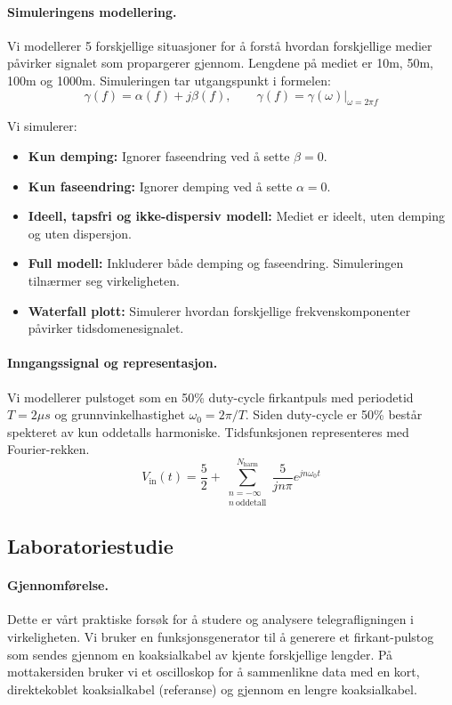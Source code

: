 \paragraph{Simuleringens modellering.}
Vi modellerer 5 forskjellige situasjoner for å forstå hvordan forskjellige medier påvirker signalet som propargerer gjennom. Lengdene på mediet er 10m, 50m, 100m og 1000m. Simuleringen tar utgangspunkt i formelen:
\[
\gamma (f) = \alpha(f) + j\beta(f), \qquad \gamma(f) = \gamma(\omega)|_{\omega = 2\pi f}
\]

Vi simulerer:
\begin{itemize}
    \item \textbf{Kun demping:} Ignorer faseendring ved å sette $\beta = 0$.
    \item \textbf{Kun faseendring:} Ignorer demping ved å sette $\alpha = 0$.
    \item \textbf{Ideell, tapsfri og ikke-dispersiv modell:} Mediet er ideelt, uten demping og uten dispersjon.
    \item \textbf{Full modell:} Inkluderer både demping og faseendring. Simuleringen tilnærmer seg virkeligheten.
    \item \textbf{Waterfall plott:} Simulerer hvordan forskjellige frekvenskomponenter påvirker tidsdomenesignalet.
\end{itemize}

\paragraph{Inngangssignal og representasjon.}
Vi modellerer pulstoget som en 50\% duty-cycle firkantpuls med periodetid $T = 2 \mu s$ og grunnvinkelhastighet $\omega_0 = 2\pi / T$. Siden duty-cycle er 50\% består spekteret av kun oddetalls harmoniske. Tidsfunksjonen representeres med Fourier-rekken.
\begin{equation}
    V_{\mathrm{in}}(t) = \frac{5}{2} + \sum_{\substack{n=-\infty\\ n\ \text{oddetall}}}^{N_{\mathrm{harm}}}\frac{5}{jn\pi} e^{jn\omega_0 t}
\end{equation} 

\subsection{Laboratoriestudie}
\paragraph{Gjennomførelse.} Dette er vårt praktiske forsøk for å studere og analysere telegrafligningen i virkeligheten. Vi bruker en funksjonsgenerator til å generere et firkant-pulstog som sendes gjennom en koaksialkabel av kjente forskjellige lengder. På mottakersiden bruker vi et oscilloskop for å sammenlikne data med en kort, direktekoblet koaksialkabel (referanse) og gjennom en lengre koaksialkabel.

